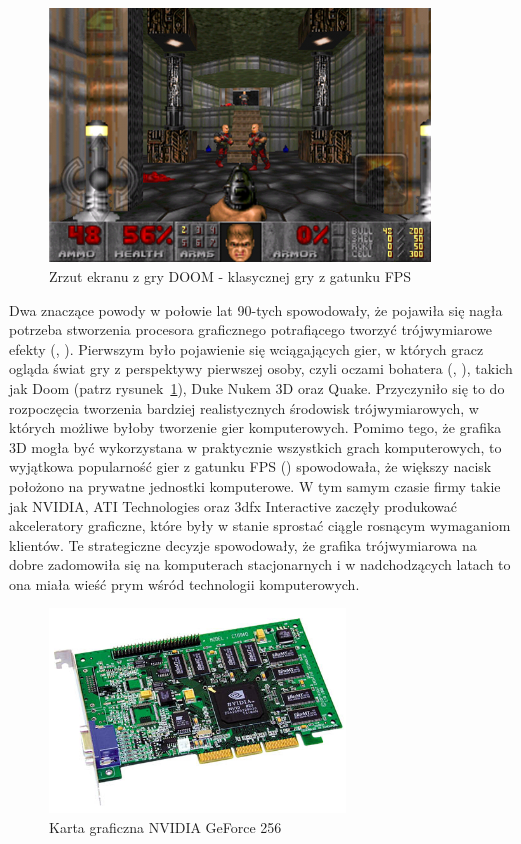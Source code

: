 \begin{figure}[h]
\centering\includegraphics[width=0.9\textwidth]{figures/03/doom.png}
\caption{Zrzut ekranu z gry DOOM - klasycznej gry z gatunku FPS}\label{rys:doom}
\end{figure}

Dwa znaczące powody w połowie lat 90-tych spowodowały, że pojawiła się nagła potrzeba stworzenia procesora graficznego potrafiącego tworzyć trójwymiarowe efekty (, ). Pierwszym było pojawienie się wciągających gier, w których gracz ogląda świat gry z perspektywy pierwszej osoby, czyli oczami bohatera (, ), takich jak Doom (patrz rysunek~\ref{rys:doom}), Duke Nukem 3D oraz Quake. Przyczyniło się to do rozpoczęcia tworzenia bardziej realistycznych środowisk trójwymiarowych, w których możliwe byłoby tworzenie gier komputerowych. Pomimo tego, że grafika 3D mogła być wykorzystana w praktycznie wszystkich grach komputerowych, to wyjątkowa popularność gier z gatunku FPS () spowodowała, że większy nacisk położono na prywatne jednostki komputerowe. W tym samym czasie firmy takie jak NVIDIA, ATI Technologies oraz 3dfx Interactive zaczęły produkować akceleratory graficzne, które były w stanie sprostać ciągle rosnącym wymaganiom klientów. Te strategiczne decyzje spowodowały, że grafika trójwymiarowa na dobre zadomowiła się na komputerach stacjonarnych i w nadchodzących latach to ona miała wieść prym wśród technologii komputerowych.

\begin{figure}[h]
\centering\includegraphics[width=0.7\textwidth]{figures/03/geforce-256.jpg}
\caption{Karta graficzna NVIDIA GeForce 256}\label{rys:gf256}
\end{figure}

